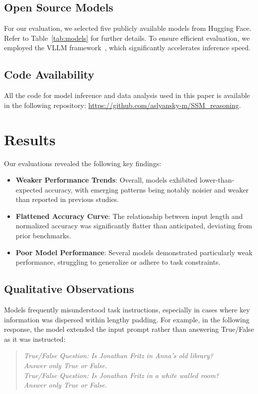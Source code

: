 \documentclass[11pt]{article}
\begin{document}
\subsection{Open Source Models}

For our evaluation, we selected five publicly available models from Hugging Face. 
Refer to Table~\ref{tab:models} for further details. To ensure efficient evaluation, we employed the VLLM framework~\citep{kwon2023efficient}, which significantly accelerates inference speed.



\subsection*{Code Availability}
All the code for model inference and data analysis used in this paper is available in the following repository: \href{https://github.com/aslyansky-m/SSM\_reasoning}{https://github.com/aslyansky-m/SSM\_reasoning}.



\section{Results}

Our evaluations revealed the following key findings:

\begin{itemize}
\item \textbf{Weaker Performance Trends}: Overall, models exhibited lower-than-expected accuracy, with emerging patterns being notably noisier and weaker than reported in previous studies.
\item \textbf{Flattened Accuracy Curve}: The relationship between input length and normalized accuracy was significantly flatter than anticipated, deviating from prior benchmarks.
\item \textbf{Poor Model Performance}: Several models demonstrated particularly weak performance, struggling to generalize or adhere to task constraints.
\end{itemize}

\subsection{Qualitative Observations}
Models frequently misunderstood task instructions, especially in cases where key information was dispersed within lengthy padding. For example, in the following response, the model extended the input prompt rather than answering True/False as it was instructed:
\begin{quote}
\textit{True/False Question: Is Jonathan Fritz in Anna's old library? \\
Answer only True or False. \\
True/False Question: Is Jonathan Fritz in a white walled room? \\
Answer only True or False.}
\end{quote}
\end{document}
